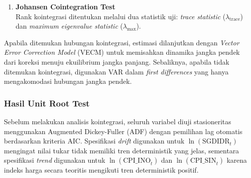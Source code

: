 \documentclass[12pt]{article}
\begin{document}
\begin{enumerate}
\begin{enumerate}
        \item \textbf{Johansen Cointegration Test} \citep{Johansen1991}\\ Rank kointegrasi 
        ditentukan melalui dua statistik uji: \textit{trace statistic} ($\lambda_{\text{trace}}$) 
        dan \textit{maximum eigenvalue statistic} ($\lambda_{\text{max}}$).
    \end{enumerate}

    Apabila ditemukan hubungan kointegrasi, estimasi dilanjutkan dengan \textit{Vector Error 
    Correction Model} (VECM) untuk memisahkan dinamika jangka pendek dari koreksi menuju 
    ekuilibrium jangka panjang. Sebaliknya, apabila tidak ditemukan kointegrasi, digunakan VAR 
    dalam \textit{first differences} yang hanya mengakomodasi hubungan jangka pendek.
\end{enumerate}

\subsubsection{Hasil Unit Root Test}

Sebelum melakukan analisis kointegrasi, seluruh variabel diuji stasioneritas menggunakan 
Augmented Dickey-Fuller (ADF) dengan pemilihan lag otomatis berdasarkan kriteria AIC. 
Spesifikasi \textit{drift} digunakan untuk $\ln(\text{SGDIDR}_t)$ mengingat nilai tukar 
tidak memiliki tren deterministik yang jelas, sementara spesifikasi \textit{trend} digunakan 
untuk $\ln(\text{CPI\_INO}_t)$ dan $\ln(\text{CPI\_SIN}_t)$ karena indeks harga secara 
teoritis mengikuti tren deterministik positif.
\end{document}
